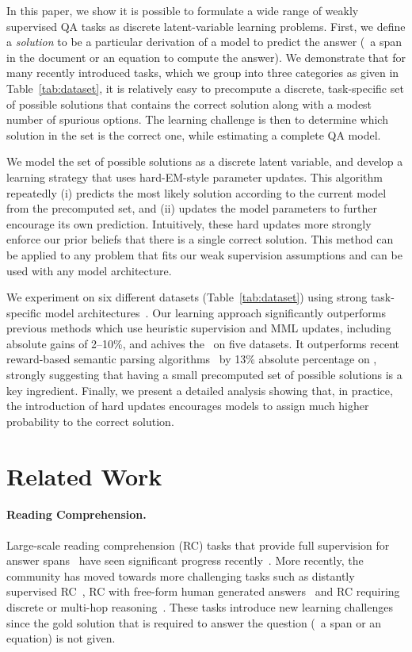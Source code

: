 \documentclass[11pt,a4paper]{article}
\begin{document}
In this paper, we show it is possible to formulate a wide range of weakly supervised QA tasks as discrete latent-variable learning problems.
First, we define a {\em solution} to be a particular derivation of a model to predict the answer (\eg\ a span in the document or an equation to compute the answer).
We demonstrate that for many recently introduced tasks, which we group into three categories as given in Table~\ref{tab:dataset}, it is relatively easy to precompute a discrete, task-specific set of possible solutions that contains the correct solution along with a modest number of spurious options. 
The learning challenge is then to determine which solution in the set is the correct one, while estimating a complete QA model. 

We model the set of possible solutions as a discrete latent variable, and develop a learning strategy that uses hard-EM-style parameter updates. This algorithm repeatedly (i) predicts the most likely solution according to the current model from the precomputed set, and (ii) updates the model parameters to further encourage its own prediction.
Intuitively, these hard updates more strongly enforce our prior beliefs that there is a single correct solution. 
This method can be applied to any problem that fits our weak supervision assumptions and can be used with any model architecture. 

We experiment on six different datasets (Table~\ref{tab:dataset}) using strong task-specific model architectures~\citep{bert,drop,hwang2019comprehensive}. 
Our learning approach significantly outperforms previous methods which use heuristic supervision and MML updates, including absolute gains of 2--10\%, and achives the \sota\ on five datasets.
It outperforms recent \sota{} reward-based semantic parsing algorithms~\citep{mapo, mapox} by 13\% absolute percentage on \wikisql, strongly suggesting that having a small precomputed set of possible solutions is a key ingredient.
Finally, we present a detailed analysis showing that, in practice, the introduction of hard updates encourages models to assign much higher probability to the correct solution.

 \section{Related Work}\label{sec:related}\paragraph{Reading Comprehension.} Large-scale reading comprehension (RC) tasks that provide full supervision for answer spans~\citep{squad} have seen significant progress recently~\citep{bidaf,dcn+,fast-and-accurate,bert}. 
More recently, the community has moved towards more challenging tasks such as distantly supervised RC~\citep{triviaqa}, RC with free-form human generated answers~\citep{narrativeqa} and RC requiring discrete or multi-hop reasoning~\citep{drop,hotpot}. 
These tasks introduce new learning challenges since the gold solution that is required to answer the question (\eg\ a span or an equation) is not given.
\end{document}
